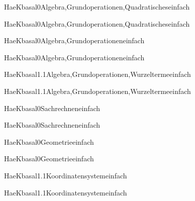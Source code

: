 \documentclass[12pt]{article}
\begin{document}
\begin{Add}{HaeK}{basal0}{Algebra,Grundoperationen,Quadratisches}{einfach}
\solution{ }
\end{Add}
\begin{Add}{HaeK}{basal0}{Algebra,Grundoperationen,Quadratisches}{einfach}
\end{Add}

\begin{Add}{HaeK}{basal0}{Algebra,Grundoperationen}{einfach}
\solution{ }
\end{Add}
\begin{Add}{HaeK}{basal0}{Algebra,Grundoperationen}{einfach}
\end{Add}

\begin{Add}{HaeK}{basal1.1}{Algebra,Grundoperationen,Wurzelterme}{einfach}
\solution{ }
\end{Add}
\begin{Add}{HaeK}{basal1.1}{Algebra,Grundoperationen,Wurzelterme}{einfach}
\end{Add}

\begin{Add}{HaeK}{basal0}{Sachrechnen}{einfach}
\solution{ }
\end{Add}
\begin{Add}{HaeK}{basal0}{Sachrechnen}{einfach}
\end{Add}

\begin{Add}{HaeK}{basal0}{Geometrie}{einfach}
\solution{ }
\end{Add}
\begin{Add}{HaeK}{basal0}{Geometrie}{einfach}
\end{Add}

\begin{Add}{HaeK}{basal1.1}{Koordinatensystem}{einfach}
\solution{ }
\end{Add}
\begin{Add}{HaeK}{basal1.1}{Koordinatensystem}{einfach}
\end{Add}
\end{document}
